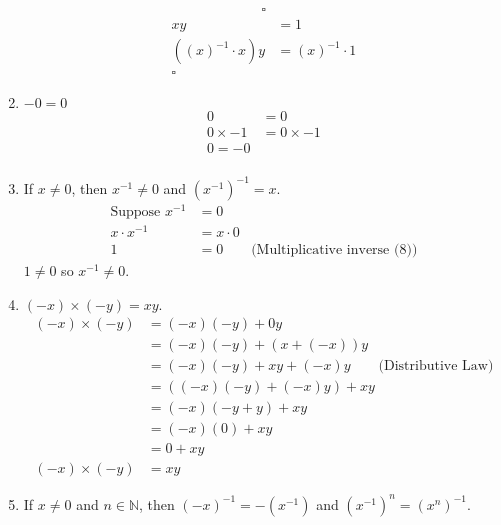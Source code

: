 \documentclass[11pt]{article}
\begin{document}
\begin{enumerate}
\begin{align*}
		      \square
	      \end{align*}
	      \begin{align*}
		      x y                  & = 1                \\
		      ((x)^{-1} \cdot x) y & = (x)^{-1} \cdot 1 \\
		      \square
	      \end{align*}
	\item $-0=0$
	      \begin{align*}
		      0           & = 0           \\
		      0 \times -1 & = 0 \times -1 \\
		      0 = - 0                     \\
	      \end{align*}
	\item If $x \neq 0$, then $x^{-1} \neq 0$ and $\left(x^{-1}\right)^{-1}=x$.
	      \begin{align*}
		      \text{Suppose }x^{-1} & = 0                                                    \\
		      x \cdot x^{-1}        & = x \cdot 0                                            \\
		      1                     & = 0         \qquad \text{(Multiplicative inverse (8))}
	      \end{align*}
	      $1 \neq 0$ so $x^{-1} \neq 0$.
	\item $(-x) \times(-y)=x y$.
	      \begin{align*}
		      (-x) \times(-y)  & = (-x)(-y) + 0y                                          \\
		                       & = (-x)(-y) + (x + (-x))y                                 \\
		                       & = (-x)(-y) + xy + (-x)y \qquad \text{(Distributive Law)} \\
		                       & = ((-x)(-y) + (-x)y) + xy                                \\
		                       & = (-x)(-y + y) + xy                                      \\
		                       & = (-x)(0) + xy                                           \\
		                       & = 0 + xy                                                 \\
		      (-x) \times (-y) & = xy
	      \end{align*}
	\item If $x \neq 0$ and $n \in \mathbb{N}$, then $(-x)^{-1}=-\left(x^{-1}\right)$ and $\left(x^{-1}\right)^n=\left(x^n\right)^{-1}$.

\end{enumerate}
\end{document}
